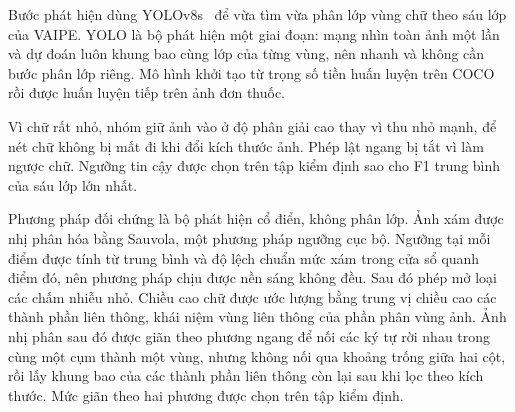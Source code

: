 Bước phát hiện dùng YOLOv8s~\cite{yolov8} để vừa tìm vừa phân lớp vùng chữ theo sáu lớp của VAIPE.
YOLO là bộ phát hiện một giai đoạn: mạng nhìn toàn ảnh một lần và dự đoán luôn khung bao cùng lớp của từng vùng, nên nhanh và không cần bước phân lớp riêng.
Mô hình khởi tạo từ trọng số tiền huấn luyện trên COCO~\cite{lin2014coco} rồi được huấn luyện tiếp trên ảnh đơn thuốc.

Vì chữ rất nhỏ, nhóm giữ ảnh vào ở độ phân giải cao thay vì thu nhỏ mạnh, để nét chữ không bị mất đi khi đổi kích thước ảnh.
Phép lật ngang bị tắt vì làm ngược chữ.
Ngưỡng tin cậy được chọn trên tập kiểm định sao cho F1 trung bình của sáu lớp lớn nhất.

Phương pháp đối chứng là bộ phát hiện cổ điển, không phân lớp.
Ảnh xám được nhị phân hóa bằng Sauvola, một phương pháp ngưỡng cục bộ. Ngưỡng tại mỗi điểm được tính từ trung bình và độ lệch chuẩn mức xám trong cửa sổ quanh điểm đó, nên phương pháp chịu được nền sáng không đều. Sau đó phép mở loại các chấm nhiễu nhỏ.
Chiều cao chữ được ước lượng bằng trung vị chiều cao các thành phần liên thông, khái niệm vùng liên thông của phần phân vùng ảnh.
Ảnh nhị phân sau đó được giãn theo phương ngang để nối các ký tự rời nhau trong cùng một cụm thành một vùng, nhưng không nối qua khoảng trống giữa hai cột, rồi lấy khung bao của các thành phần liên thông còn lại sau khi lọc theo kích thước.
Mức giãn theo hai phương được chọn trên tập kiểm định.
